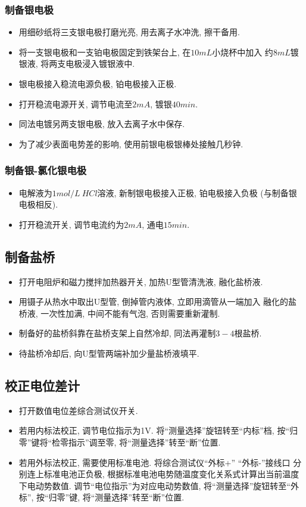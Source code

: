 \documentclass[a4paper]{article}
\begin{document}
\subsubsection{制备银电极}
\begin{itemize}
	\item 用细砂纸将三支银电极打磨光亮, 用去离子水冲洗, 擦干备用.
	\item 将一支银电极和一支铂电极固定到铁架台上, 在$10mL$小烧杯中加入
	约$8mL$镀银液, 将两支电极浸入镀银液中.
	\item 银电极接入稳流电源负极, 铂电极接入正极.
	\item 打开稳流电源开关, 调节电流至$2mA$, 镀银$40min$.
	\item 同法电镀另两支银电极, 放入去离子水中保存.
	\item 为了减少表面电势差的影响, 使用前银电极银棒处接触几秒钟.
\end{itemize}
\subsubsection{制备银-氯化银电极}
\begin{itemize}
	\item 电解液为$1mol/L~HCl$溶液, 新制银电极接入正极, 铂电极接入负极
	(与制备银电极相反).
	\item 打开稳流开关, 调节电流约为$2mA$, 通电$15min$.
\end{itemize}
\subsection{制备盐桥}
\begin{itemize}
	\item 打开电阻炉和磁力搅拌加热器开关, 加热U型管清洗液, 融化盐桥液.
	\item 用镊子从热水中取出U型管, 倒掉管内液体, 立即用滴管从一端加入
	融化的盐桥液, 一次性加满, 中间不能有气泡, 否则需要重新灌制.
	\item 制备好的盐桥斜靠在盐桥支架上自然冷却, 同法再灌制$3-4$根盐桥.
	\item 待盐桥冷却后, 向U型管两端补加少量盐桥液填平.
\end{itemize}
\subsection{校正电位差计}
\begin{itemize}
	\item 打开数值电位差综合测试仪开关.
	\item 若用内标法校正, 调节电位指示为1V. 将``测量选择''旋钮转至``内标''档,
	按``归零''键将``检零指示''调至零, 将``测量选择''转至``断''位置.
	\item 若用外标法校正, 需要使用标准电池. 将综合测试仪``外标+'' ``外标-''接线口
	分别连上标准电池正负极, 根据标准电池电势随温度变化关系式计算出当前温度下电动势数值.
	调节``电位指示''为对应电动势数值, 将``测量选择''旋钮转至``外标'', 按``归零''键, 
	将``测量选择''转至``断''位置.
\end{itemize}
\end{document}
